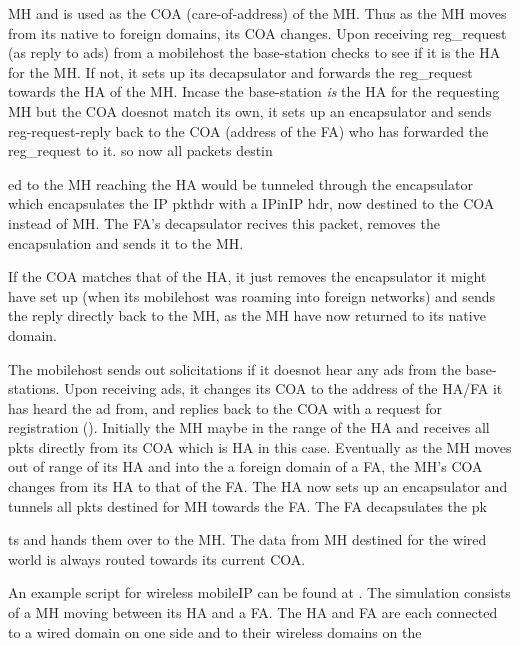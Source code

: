 {MH and is used as the COA (care-of-address) of the MH. Thus as the MH moves from its native to foreign domains, its COA changes.
Upon receiving  reg\_request (as reply to ads) from a mobilehost the base-station checks to see if it is the HA for the MH. If not, it sets up its decapsulator and forwards the reg\_request towards the HA of the MH. 
Incase the base-station {\em is} the HA for the requesting MH but the COA doesnot match its own, it sets up an encapsulator and sends reg-request-reply back to the COA (address of the FA) who has forwarded the reg\_request to it. so now all packets destin









ed to the MH reaching the HA would be tunneled through the encapsulator which encapsulates the IP pkthdr with a IPinIP hdr, now destined to the COA instead of MH. The FA's decapsulator recives this packet, removes the encapsulation and sends it to the MH.










If the COA matches that of the HA, it just removes the encapsulator it might have set up (when its mobilehost was roaming into foreign networks) and sends the reply directly back to the MH, as the MH have now returned to its native domain.

The mobilehost sends out solicitations if it doesnot hear any ads from the
base-stations. Upon receiving ads, it changes its COA to the address of
the HA/FA it has heard the ad from, and replies back to the COA with a
request for registration ().
Initially the MH maybe in the range of the HA and receives all pkts directly from its COA which is HA in this case.
Eventually as the MH moves out of range of its HA and into the a foreign domain of a FA, the MH's COA changes from its HA to that of the FA. The HA now sets up an encapsulator and tunnels all pkts destined for MH towards the FA. The FA decapsulates the pk









ts and hands them over to the MH. The data from MH destined for the wired world is always routed towards its current COA.

An example script for wireless mobileIP can be found at . The simulation consists of a MH moving between its HA and a FA. The HA and FA are each connected to a wired domain on one side and to their wireless domains on the









}
